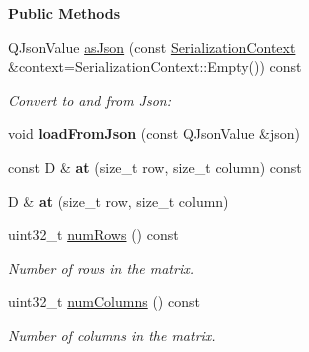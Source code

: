 \begin{Indent}\textbf{ Public Methods}\par
{\em 
\begin{DoxyItemize}
\item 
\end{DoxyItemize}}\begin{DoxyCompactItemize}
\item 
\mbox{\label{classrev_1_1_matrix_a20ce3d94cee45fe041901e47eadae699}} 
Q\+Json\+Value \mbox{\hyperlink{classrev_1_1_matrix_a20ce3d94cee45fe041901e47eadae699}{as\+Json}} (const \mbox{\hyperlink{structrev_1_1_serialization_context}{Serialization\+Context}} \&context=Serialization\+Context\+::\+Empty()) const
\begin{DoxyCompactList}\small\item\em Convert to and from Json\+: \end{DoxyCompactList}\item 
\mbox{\label{classrev_1_1_matrix_ac21aff4570624074262ba29ef07caa72}} 
void {\bfseries load\+From\+Json} (const Q\+Json\+Value \&json)
\item 
\mbox{\label{classrev_1_1_matrix_a8ce903db9525aaeca4e7aa0e59169ea2}} 
const D \& {\bfseries at} (size\+\_\+t row, size\+\_\+t column) const
\item 
\mbox{\label{classrev_1_1_matrix_a9534f77065f4755fafffc4fd9658dfe6}} 
D \& {\bfseries at} (size\+\_\+t row, size\+\_\+t column)
\item 
\mbox{\label{classrev_1_1_matrix_a333da8d363e3f4475c36ff6f6064e8a1}} 
uint32\+\_\+t \mbox{\hyperlink{classrev_1_1_matrix_a333da8d363e3f4475c36ff6f6064e8a1}{num\+Rows}} () const
\begin{DoxyCompactList}\small\item\em Number of rows in the matrix. \end{DoxyCompactList}\item 
\mbox{\label{classrev_1_1_matrix_a8bcf22ce81956d0714a085cb4ba63dbc}} 
uint32\+\_\+t \mbox{\hyperlink{classrev_1_1_matrix_a8bcf22ce81956d0714a085cb4ba63dbc}{num\+Columns}} () const
\begin{DoxyCompactList}\small\item\em Number of columns in the matrix. \end{DoxyCompactList}\item 

\end{DoxyCompactItemize}
\end{Indent}
